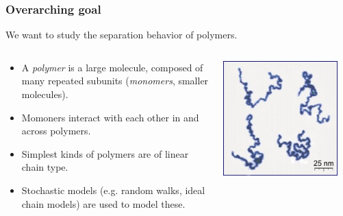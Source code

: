 \begin{frame}
        \titlepage
\end{frame}

\begin{frame}[t]
    \frametitle{Overarching goal}

    We want to study the separation behavior of polymers.

    \vfill

    \begin{columns}
        \begin{column}{0.6\textwidth}
            \begin{itemize}
                \item {} A \emph{polymer} is a large molecule, composed of many repeated subunits (\emph{monomers}, smaller molecules).
                \item {} Momoners interact with each other in and across polymers.
                \item {} Simplest kinds of polymers are of linear chain type.
                \item Stochastic models (e.g. random walks, ideal chain models) are used to model these.
            \end{itemize}
        \end{column}
        \begin{column}{0.4\textwidth}
            \centering
            \includegraphics[width=0.9\textwidth]{figures/Single_Polymer_Chains_AFM.jpg}
        \end{column}
    \end{columns}
\end{frame}

